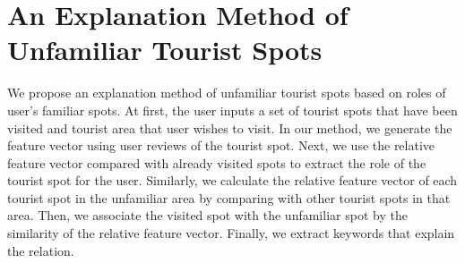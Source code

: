 \documentclass[journal]{IAENGtran}
\begin{document}
\section{An Explanation Method of Unfamiliar Tourist Spots}
\label{sec:An Explainaton Method of Unfamiliar Tourist Spots}
We propose an explanation method of unfamiliar tourist spots based on roles of user's familiar spots.
At first, the user inputs a set of tourist spots that have been visited and tourist area that user wishes to visit.
In our method, we generate the feature vector using user reviews of the tourist spot.
Next, we use the relative feature vector compared with already visited spots to extract the role of the tourist spot for the user.
Similarly, we calculate the relative feature vector of each tourist spot in the unfamiliar area by comparing with other tourist spots in that area.
Then, we associate the visited spot with the unfamiliar spot by the similarity of the relative feature vector.
Finally, we extract keywords that explain the relation.

\end{document}
